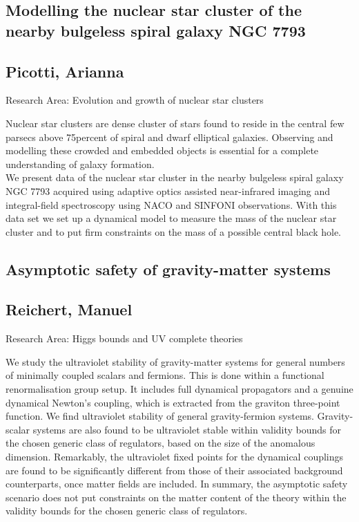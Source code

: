 \subsection*{\centering \large Modelling the nuclear star cluster of the nearby bulgeless spiral galaxy NGC 7793}
\subsection*{\centering \normalsize Picotti, Arianna}
Research Area: Evolution and growth of nuclear star clusters\newline

\noindent Nuclear star clusters are dense cluster of stars found to reside in the central few parsecs above 75percent of spiral and dwarf elliptical galaxies. Observing and modelling these crowded and embedded objects is essential for a complete understanding of galaxy formation.\\We present data of the nuclear star cluster in the nearby bulgeless spiral galaxy NGC 7793 acquired using adaptive optics assisted near-infrared imaging and integral-field spectroscopy using NACO and SINFONI observations. With this data set we set up a dynamical model to measure the mass of the nuclear star cluster and to put firm constraints on the mass of a possible central black hole.


\subsection*{\centering \large Asymptotic safety of gravity-matter systems}
\subsection*{\centering \normalsize Reichert, Manuel}
Research Area: Higgs bounds and UV complete theories\newline

\noindent We study the ultraviolet stability of gravity-matter systems for general numbers of minimally coupled scalars and fermions. This is done within a functional renormalisation group setup. It includes full dynamical propagators and a genuine dynamical Newton's coupling, which is extracted from the graviton three-point function. We find ultraviolet stability of general gravity-fermion systems. Gravity-scalar systems are also found to be ultraviolet stable within validity bounds for the chosen generic class of regulators, based on the size of the anomalous dimension. Remarkably, the ultraviolet fixed points for the dynamical couplings are found to be significantly different from those of their associated background counterparts, once matter fields are included. In summary, the asymptotic safety scenario does not put constraints on the matter content of the theory within the validity bounds for the chosen generic class of regulators.
\newpage
